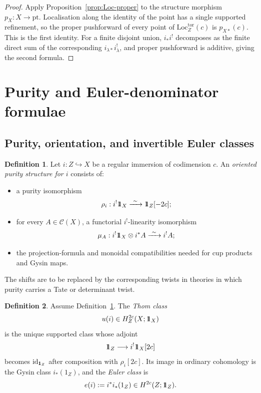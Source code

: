 \documentclass[10pt,a4paper,dvipsnames,x11names]{amsart}
\newcommand{\one}{1\hskip-3.5pt1}
\newcommand{\C}{\mathcal C}
\newcommand{\pt}{\mathrm{pt}}
\newcommand{\id}{\mathrm{id}}
\newcommand{\Loc}{\mathrm{Loc}}
\numberwithin{equation}{section}
\theoremstyle{plain}
\theoremstyle{definition}
\newtheorem{definition}[definition]{Definition}
\theoremstyle{remark}
\begin{document}
\begin{proof}
Apply Proposition~\ref{prop:Loc-proper} to the structure morphism $p_X:X\to\pt$.  Localisation along the identity of the point has a single supported refinement, so the proper pushforward of every point of $\Loc_Z^{\mathrm{tor}}(c)$ is $p_{X*}(c)$.  This is the first identity.  For a finite disjoint union, $i_*i^!$ decomposes as the finite direct sum of the corresponding $i_{\lambda*}i_\lambda^!$, and proper pushforward is additive, giving the second formula.
\end{proof}


\section{Purity and Euler-denominator formulae}\label{sec:pure}

\subsection{Purity, orientation, and invertible Euler classes}

\begin{definition}\label{def:purity-axiom}
Let $i:Z\hookrightarrow X$ be a regular immersion of codimension $c$.
An \emph{oriented purity structure for $i$} consists of:
\begin{itemize}
\item a purity isomorphism
\[
\rho_i:i^!\one_X\xrightarrow{\ \sim\ }\one_Z[-2c];
\]
\item for every $A\in\C(X)$, a functorial $i^!$-linearity isomorphism
\[
\mu_A:i^!\one_X\otimes i^*A\xrightarrow{\ \sim\ }i^!A;
\]
\item the projection-formula and monoidal compatibilities needed for cup products and Gysin maps.
\end{itemize}
The shifts are to be replaced by the corresponding twists in theories in which purity carries a Tate or determinant twist.
\end{definition}

\begin{definition}\label{def:thom-euler}
Assume Definition~\ref{def:purity-axiom}.  The \emph{Thom class}
\[
u(i)\in H_Z^{2c}(X;\one_X)
\]
is the unique supported class whose adjoint
\[
\one_Z\longrightarrow i^!\one_X[2c]
\]
becomes $\id_{\one_Z}$ after composition with $\rho_i[2c]$.
Its image in ordinary cohomology is the Gysin class $i_*(1_Z)$, and the \emph{Euler class} is
\[
e(i):=i^*i_*(1_Z)\in H^{2c}(Z;\one_Z).
\]
\end{definition}
\end{document}
